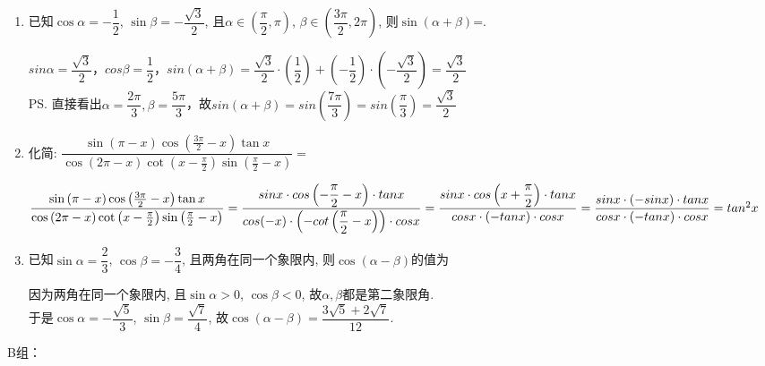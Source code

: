 \begin{enumerate}
\item 已知$\cos\alpha=-\dfrac{1}{2}$, $\sin\beta=-\dfrac{\sqrt{3}}{2}$, 且$\alpha\in\left(\dfrac{\pi}{2},\pi\right)$, $\beta\in\left(\dfrac{3\pi}{2},2\pi\right)$,
则$\sin\left(\alpha+\beta\right)$=. 
\begin{jieda}
    $sin\alpha=\dfrac{\sqrt{3}}{2}$，$cos\beta = \dfrac{1}{2}$，$sin(\alpha+\beta) = \dfrac{\sqrt{3}}{2} \cdot \left(\dfrac{1}{2}\right) + \left(-\dfrac{1}{2}\right)\cdot\left(-\dfrac{\sqrt{3}}{2}\right) =  \dfrac{\sqrt{3}}{2}$ \\
    \ps 直接看出$\alpha = \dfrac{2\pi}{3}, \beta = \dfrac{5\pi}{3}$，故$sin\left(\alpha+\beta\right) = sin\left(\dfrac{7\pi}{3}\right) = sin\left(\dfrac{\pi}{3}\right) = \dfrac{\sqrt{3}}{2}$
\end{jieda}
\item 化简: $\dfrac{\sin\left(\pi-x\right)\cos\left(\frac{3\pi}{2}-x\right)\tan{x}}{\cos\left(2\pi-x\right)\cot\left(x-\frac{\pi}{2}\right)\sin\left(\frac{\pi}{2}-x\right)}=$
\begin{jieda}
    $\dfrac{\sin\left(\pi-x\right)\cos\left(\frac{3\pi}{2}-x\right)\tan{x}}{\cos\left(2\pi-x\right)\cot\left(x-\frac{\pi}{2}\right)\sin\left(\frac{\pi}{2}-x\right)}= \dfrac{sinx \cdot cos\left(-\dfrac{\pi}{2}-x\right)\cdot tanx}{cos(-x) \cdot \left(-cot\left(\dfrac{\pi}{2} - x\right)\right) \cdot cosx} \\
    = \dfrac{sinx \cdot cos\left(x+\dfrac{\pi}{2}\right)\cdot tanx}{cosx \cdot (-tanx) \cdot cosx} = \dfrac{sinx \cdot \left(-sinx\right)\cdot tanx}{cosx \cdot (-tanx) \cdot cosx} = tan^2x$
\end{jieda}
\item 已知$\sin\alpha=\dfrac{2}{3}$, $\cos\beta=-\dfrac{3}{4}$, 且两角在同一个象限内, 则$\cos\left(\alpha-\beta\right)$的值为
\begin{jieda}
因为两角在同一个象限内, 且$\sin\alpha>0$, $\cos\beta<0$, 故$\alpha,\beta$都是第二象限角. \\
于是$\cos\alpha=-\dfrac{\sqrt{5}}{3}$, $\sin\beta=\dfrac{\sqrt{7}}{4}$, 故$\cos\left(\alpha-\beta\right)=\dfrac{3\sqrt{5}+2\sqrt{7}}{12}$. 
\end{jieda}

\end{enumerate}
B组：
